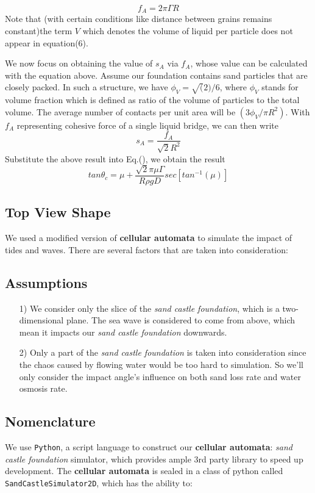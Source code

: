 \documentclass[12pt]{article}
\begin{document}
$$f_A = 2\pi \Gamma R$$
Note that (with certain conditions like distance between grains remains constant)the term $V$ which denotes the volume of liquid per particle does not appear in equation(6).
\par
We now focus on obtaining the value of $s_A$ via $f_A$, whose value can be calculated with the equation above. Assume our foundation contains sand particles that are closely packed. In such a structure, we have $\phi_V = \sqrt(2)/6$, where $\phi_V$ stands for volume fraction which is defined as ratio of the volume of particles to the total volume. The average number of contacts per unit area will be $(3\phi_V/\pi R^2)$. With $f_A$ representing cohesive force of a single liquid bridge, we can then write
$$ s_A = \frac{f_A}{\sqrt{2}R^2}$$
Substitute the above result into Eq.(), we obtain the result
$$ tan\theta_c = \mu + \frac{\sqrt{2}\pi\mu\Gamma}{R\rho gD}sec[tan^{-1}(\mu)] $$

\subsection{Top View Shape}
\newenvironment{longlisting}{\captionsetup{type=listing}}{}

\par
We used a modified version of\textbf{ cellular automata} to simulate the impact of tides and waves. There are several factors that are taken into consideration:
\par
\subsection{Assumptions}
\begin{itemize}
    \item [1)]
          We consider only the slice of the \textit{sand castle foundation}, which is a two-dimensional plane. The sea wave is considered to come from above, which mean it impacts our \textit{sand castle foundation} downwards.
    \item [2)]
          Only a part of the \textit{sand castle foundation} is taken into consideration since the chaos caused by flowing water would be too hard to simulation. So we'll only consider the impact angle's influence on both sand loss rate and water osmosis rate.
\end{itemize}

\subsection{Nomenclature}
We use \texttt{Python}, a script language to construct our \textbf{cellular automata}: \textit{sand castle foundation} simulator, which provides ample 3rd party library to speed up development. The \textbf{cellular automata} is sealed in a class of python called \texttt{SandCastleSimulator2D}, which has the ability to:
\end{document}
